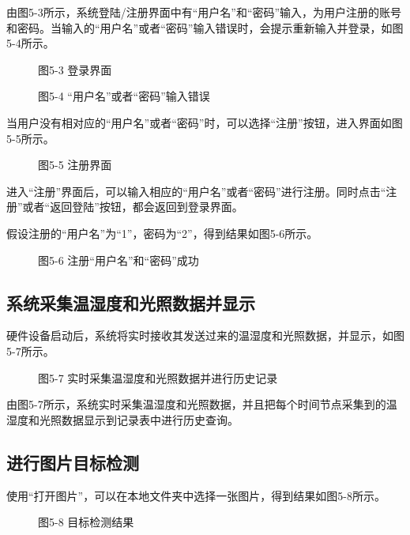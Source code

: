 \documentclass[12pt, a4paper, twoside]{ctexart}
\begin{document}
由图5-3所示，系统登陆/注册界面中有“用户名”和“密码”输入，为用户注册的账号和密码。当输入的“用户名”或者“密码”输入错误时，会提示重新输入并登录，如图5-4所示。


\begin{figure}[htbp]
\centering
\caption{图5-3 登录界面}
\end{figure}


\begin{figure}[htbp]
\centering
\caption{图5-4 “用户名”或者“密码”输入错误}
\end{figure}

当用户没有相对应的“用户名”或者“密码”时，可以选择“注册”按钮，进入界面如图5-5所示。


\begin{figure}[htbp]
\centering
\caption{图5-5 注册界面}
\end{figure}

进入“注册”界面后，可以输入相应的“用户名”或者“密码”进行注册。同时点击“注册”或者“返回登陆”按钮，都会返回到登录界面。

假设注册的“用户名”为“1”，密码为“2”，得到结果如图5-6所示。


\begin{figure}[htbp]
\centering
\caption{图5-6 注册“用户名”和“密码”成功}
\end{figure}


\subsection{系统采集温湿度和光照数据并显示}

硬件设备启动后，系统将实时接收其发送过来的温湿度和光照数据，并显示，如图5-7所示。


\begin{figure}[htbp]
\centering
\caption{图5-7 实时采集温湿度和光照数据并进行历史记录}
\end{figure}

由图5-7所示，系统实时采集温湿度和光照数据，并且把每个时间节点采集到的温湿度和光照数据显示到记录表中进行历史查询。


\subsection{进行图片目标检测}

使用“打开图片”，可以在本地文件夹中选择一张图片，得到结果如图5-8所示。


\begin{figure}[htbp]
\centering
\caption{图5-8 目标检测结果}
\end{figure}
\end{document}
